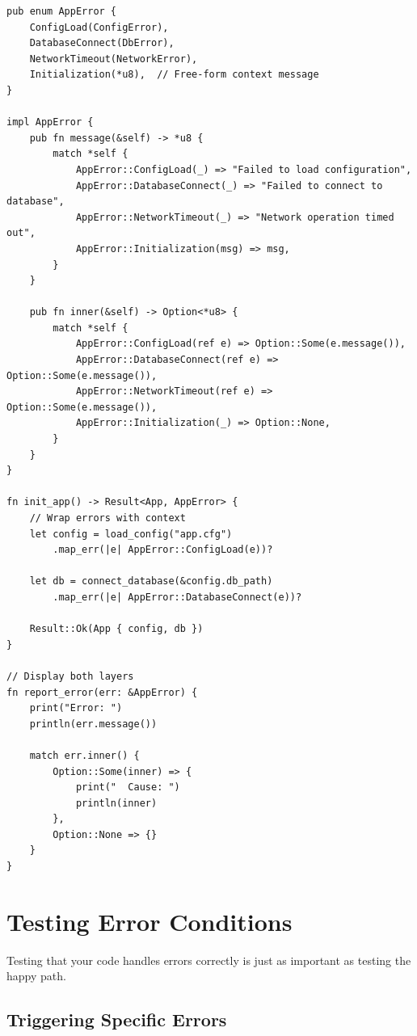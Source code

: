 \begin{lstlisting}
pub enum AppError {
    ConfigLoad(ConfigError),
    DatabaseConnect(DbError),
    NetworkTimeout(NetworkError),
    Initialization(*u8),  // Free-form context message
}

impl AppError {
    pub fn message(&self) -> *u8 {
        match *self {
            AppError::ConfigLoad(_) => "Failed to load configuration",
            AppError::DatabaseConnect(_) => "Failed to connect to database",
            AppError::NetworkTimeout(_) => "Network operation timed out",
            AppError::Initialization(msg) => msg,
        }
    }

    pub fn inner(&self) -> Option<*u8> {
        match *self {
            AppError::ConfigLoad(ref e) => Option::Some(e.message()),
            AppError::DatabaseConnect(ref e) => Option::Some(e.message()),
            AppError::NetworkTimeout(ref e) => Option::Some(e.message()),
            AppError::Initialization(_) => Option::None,
        }
    }
}

fn init_app() -> Result<App, AppError> {
    // Wrap errors with context
    let config = load_config("app.cfg")
        .map_err(|e| AppError::ConfigLoad(e))?

    let db = connect_database(&config.db_path)
        .map_err(|e| AppError::DatabaseConnect(e))?

    Result::Ok(App { config, db })
}

// Display both layers
fn report_error(err: &AppError) {
    print("Error: ")
    println(err.message())

    match err.inner() {
        Option::Some(inner) => {
            print("  Cause: ")
            println(inner)
        },
        Option::None => {}
    }
}
\end{lstlisting}

\section{Testing Error Conditions}
\label{sec:testing-errors}

Testing that your code handles errors correctly is just as important as testing the happy path.

\subsection{Triggering Specific Errors}

